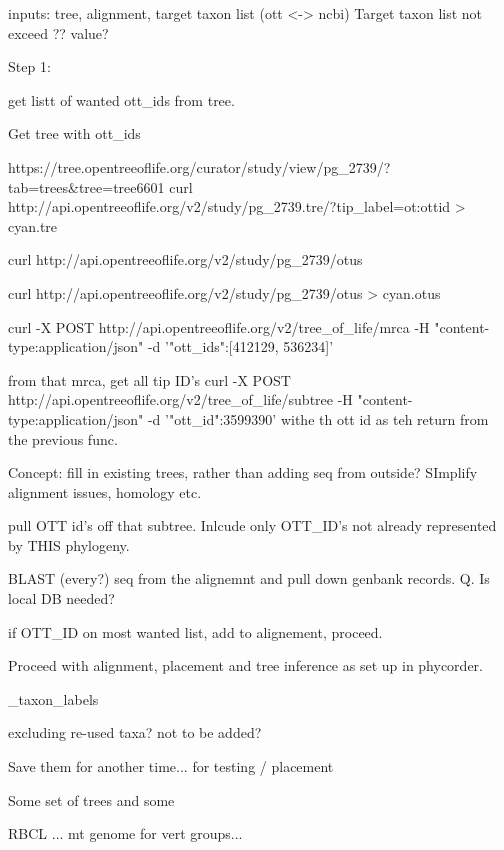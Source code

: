 \documentclass[a4paper,10pt]{article}
\begin{document}
inputs: tree, alignment, target taxon list (ott <-> ncbi)
Target taxon list not exceed ?? value?



Step 1: 

get listt of wanted ott_ids from tree.

Get tree with ott_ids

https://tree.opentreeoflife.org/curator/study/view/pg_2739/?tab=trees&tree=tree6601
curl http://api.opentreeoflife.org/v2/study/pg_2739.tre/?tip_label=ot:ottid > cyan.tre

curl http://api.opentreeoflife.org/v2/study/pg_2739/otus

curl http://api.opentreeoflife.org/v2/study/pg_2739/otus > cyan.otus


curl -X POST http://api.opentreeoflife.org/v2/tree_of_life/mrca -H "content-type:application/json" -d '{"ott_ids":[412129, 536234]}'

from that mrca, get all tip ID's
curl -X POST http://api.opentreeoflife.org/v2/tree_of_life/subtree -H "content-type:application/json" -d '{"ott_id":3599390}'
withe th ott id as teh return from the previous func.

Concept: fill in existing trees, rather than adding seq from outside? SImplify alignment issues, homology etc.

pull OTT id's off that subtree. Inlcude only OTT_ID's not already represented by THIS phylogeny.


BLAST (every?) seq from the alignemnt and pull down genbank records. Q. Is local DB needed?

if OTT_ID on most wanted list, add to alignement, proceed.

Proceed with alignment, placement and tree inference as set up in phycorder.


_taxon_labels 


excluding re-used taxa? not to be added? 

Save them for another time...
for testing / placement 


Some set of trees and some 

RBCL ... mt genome for vert groups...
\end{document}
